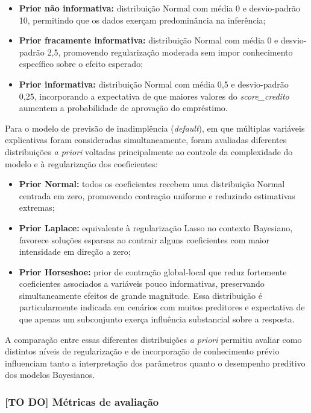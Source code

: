 \documentclass[
  brazilian,
  12pt,
  letterpaper,
  DIV=11,
  numbers=noendperiod]{scrartcl}
\providecommand{\tightlist}{%
  \setlength{\itemsep}{0pt}\setlength{\parskip}{0pt}}
\begin{document}
\begin{itemize}
\tightlist
\item
  \textbf{Prior não informativa:} distribuição Normal com média 0 e
  desvio-padrão 10, permitindo que os dados exerçam predominância na
  inferência;
\item
  \textbf{Prior fracamente informativa:} distribuição Normal com média 0
  e desvio-padrão 2,5, promovendo regularização moderada sem impor
  conhecimento específico sobre o efeito esperado;
\item
  \textbf{Prior informativa:} distribuição Normal com média 0,5 e
  desvio-padrão 0,25, incorporando a expectativa de que maiores valores
  do \emph{score\_credito} aumentem a probabilidade de aprovação do
  empréstimo.
\end{itemize}

Para o modelo de previsão de inadimplência (\emph{default}), em que
múltiplas variáveis explicativas foram consideradas simultaneamente,
foram avaliadas diferentes distribuições \emph{a priori} voltadas
principalmente ao controle da complexidade do modelo e à regularização
dos coeficientes:

\begin{itemize}
\tightlist
\item
  \textbf{Prior Normal:} todos os coeficientes recebem uma distribuição
  Normal centrada em zero, promovendo contração uniforme e reduzindo
  estimativas extremas;
\item
  \textbf{Prior Laplace:} equivalente à regularização Lasso no contexto
  Bayesiano, favorece soluções esparsas ao contrair alguns coeficientes
  com maior intensidade em direção a zero;
\item
  \textbf{Prior Horseshoe:} prior de contração global-local que reduz
  fortemente coeficientes associados a variáveis pouco informativas,
  preservando simultaneamente efeitos de grande magnitude. Essa
  distribuição é particularmente indicada em cenários com muitos
  preditores e expectativa de que apenas um subconjunto exerça
  influência substancial sobre a resposta.
\end{itemize}

A comparação entre essas diferentes distribuições \emph{a priori}
permitiu avaliar como distintos níveis de regularização e de
incorporação de conhecimento prévio influenciam tanto a interpretação
dos parâmetros quanto o desempenho preditivo dos modelos Bayesianos.

\subsubsection{{[}TO DO{]} Métricas de
avaliação}\label{to-do-muxe9tricas-de-avaliauxe7uxe3o}
\end{document}
